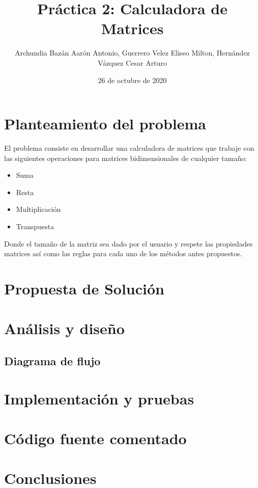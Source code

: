 \documentclass[letter,twocolumn]{revtex4}
\begin{document}
\title{Práctica 2: Calculadora de Matrices}
\author{Archundia Bazán Aarón Antonio, Guerrero Velez Eliseo Milton, Hernández Vázquez Cesar Arturo}

\date{26 de octubre de 2020}
\maketitle


\section{Planteamiento del problema}

El problema consiste en desarrollar una calculadora de matrices que trabaje con las siguientes operaciones para matrices bidimensionales de cualquier tamaño: 
\begin{itemize}
    \item Suma
    \item Resta
    \item Multiplicación
    \item Transpuesta
\end{itemize}
Donde el tamaño de la matriz sea dado por el usuario y respete las propiedades matrices así como las reglas para cada uno de los métodos antes propuestos.

\section{Propuesta de Solución}
   

\section{Análisis y diseño}

\subsection{Diagrama de flujo}


\clearpage

\section{Implementación y pruebas}
 

\section{Código fuente comentado}




\section{Conclusiones}
\end{document}
